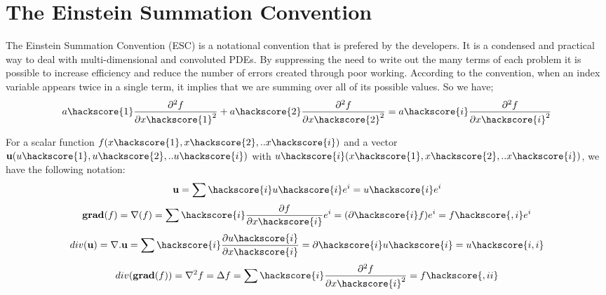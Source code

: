 
%
%
%

\chapter{The Einstein Summation Convention}

The Einstein Summation Convention (ESC) is a notational convention that is prefered by the \esc developers. It is a condensed and practical way to deal with multi-dimensional and convoluted PDEs. By suppressing the need to write out the many terms of each problem it is possible to increase efficiency and reduce the number of errors created through poor working. According to the convention, when an index variable appears twice in a single term, it implies that we are summing over all of its possible values.
So we have;
\begin{equation}
a\hackscore{1}\frac{\partial^2 f}{\partial x\hackscore{1}^2} + a\hackscore{2}\frac{\partial^2 f}{\partial x\hackscore{2}^2} = a\hackscore{i}\frac{\partial^2 f}{\partial x\hackscore{i}^2}
\end{equation}

For a scalar function $f(x\hackscore{1},x\hackscore{2},..x\hackscore{i})$ and a vector $\mathbf{u}(u\hackscore{1},u\hackscore{2},..u\hackscore{i})$ with $u\hackscore{i}(x\hackscore{1},x\hackscore{2},..x\hackscore{i})$, we have the following notation:
\begin{equation}
\mathbf{u}=\sum\hackscore{i}u\hackscore{i}e^i = u\hackscore{i}e^i
\end{equation}
\begin{equation}
\mathbf{grad}(f) = \mathbf{\nabla}(f) = \sum\hackscore{i}\frac{\partial f}{\partial x\hackscore{i}}e^i = (\partial\hackscore{i} f)e^i = f\hackscore{,i}e^i
\end{equation}
\begin{equation}
div(\mathbf{u}) = \mathbf{\nabla}.\mathbf{u} = \sum\hackscore{i}\frac{\partial u\hackscore{i}}{\partial x\hackscore{i}} = \partial\hackscore{i} u\hackscore{i} = u\hackscore{i,i}
\end{equation}
\begin{equation}
div(\mathbf{grad}(f)) = \nabla^2 f = \Delta f = \sum\hackscore{i}\frac{\partial^2 f}{\partial x\hackscore{i}^2} = f\hackscore{,ii}
\end{equation}
